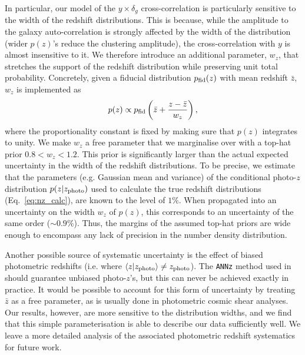 \documentclass[useAMS,usenatbib]{mn2e}
\begin{document}
      In particular, our model of the $y\times \delta_g$ cross-correlation is particularly sensitive to the width of the redshift distributions. This is because, while the amplitude to the galaxy auto-correlation is strongly affected by the width of the distribution (wider $p(z)$'s reduce the clustering amplitude), the cross-correlation with $y$ is almost insensitive to it. We therefore introduce an additional parameter, $w_z$, that stretches the support of the redshift distribution while preserving unit total probability. Concretely, given a fiducial distribution $p_{\rm fid}(z)$ with mean redshift $\bar{z}$, $w_z$ is implemented as
      \begin{equation}
        p(z)\propto p_{\rm fid}\left(\bar{z}+\frac{z-\bar{z}}{w_z}\right),
      \end{equation}
      where the proportionality constant is fixed by making sure that $p(z)$ integrates to unity. We make $w_z$ a free parameter that we marginalise over with a top-hat prior $0.8<w_z<1.2$. This prior is significantly larger than the actual expected uncertainty in the width of the redshift distributions. To be precise, we estimate that the parameters (e.g. Gaussian mean and variance) of the conditional photo-$z$ distribution $p(z|z_{\rm photo})$ used to calculate the true redshift distributions (Eq.\!~\ref{eq:nz_calc}), are known to the level of $1\%$. When propagated into an uncertainty on the width $w_z$ of $p(z)$, this corresponds to an uncertainty of the same order ($\sim0.9\%$). Thus, the margins of the assumed top-hat priors are wide enough to encompass any lack of precision in the number density distribution.
      
      Another possible source of systematic uncertainty is the effect of biased photometric redshifts (i.e. where $\langle z|z_{\rm photo}\rangle\neq z_{\rm photo}$). The {\tt ANNz} method used in \cite{2018MNRAS.481.1133P} should guarantee unbiased photo-$z$'s, but this can never be achieved exactly in practice. It would be possible to account for this form of uncertainty by treating $\bar{z}$ as a free parameter, as is usually done in photometric cosmic shear analyses. Our results, however, are more sensitive to the distribution widths, and we find that this simple parameterisation is able to describe our data sufficiently well. We leave a more detailed analysis of the associated photometric redshift systematics for future work.
\end{document}
